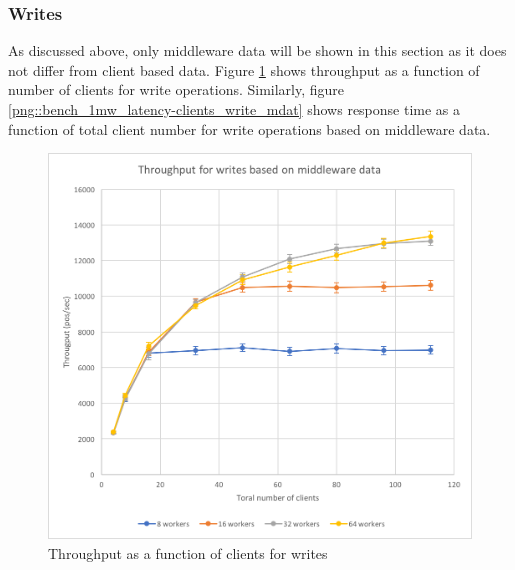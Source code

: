 \documentclass[11pt,a4paper]{article}
\begin{document}
\subsubsection{Writes}
As discussed above, only middleware data will be shown in this section as it does not differ from client based data. Figure \ref{png::bench_1mw_through-clients_write_mdat} shows throughput as a function of number of clients for write operations. Similarly, figure \ref{png::bench_1mw_latency-clients_write_mdat} shows response time as a function of total client number for write operations based on middleware data.

\begin{figure}[!h]
    \centering
    \begin{minipage}[b]{.45\textwidth}
        \centering
        \includegraphics[width=\textwidth]{processing/graphics/bench_1mw_through-clients_write_mdat.png}
        \caption{Throughput as a function of clients for writes}
        \label{png::bench_1mw_through-clients_write_mdat}
    \end{minipage}
    \qquad
    \begin{minipage}[b]{.45\textwidth}
        \centering

\end{minipage}
\end{figure}
\end{document}
